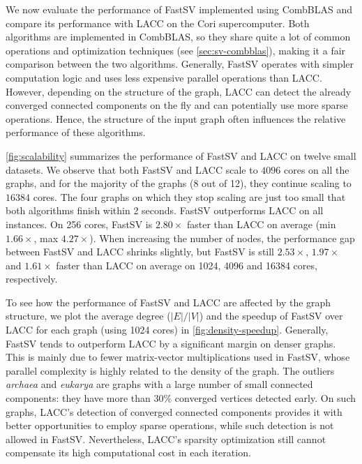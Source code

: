 \documentclass{sokendai_thesis} %
\newcommand{\Name}[0]{FastSV} %
\begin{document}
We now evaluate the performance of \Name{} implemented using CombBLAS and compare its performance with LACC on the Cori supercomputer.
Both algorithms are implemented in CombBLAS, so they share quite a lot of common operations and optimization techniques (see \autoref{sec:sv-combblas}), making it a fair comparison between the two algorithms.
Generally, \Name{} operates with simpler computation logic and uses less expensive parallel operations than LACC.
However, depending on the structure of the graph, LACC can detect the already converged connected components on the fly and can potentially use more sparse operations. 
Hence, the structure of the input graph often influences the relative performance of these algorithms.

\autoref{fig:scalability} summarizes the performance of \Name{} and LACC on twelve small datasets.
We observe that both \Name{} and LACC  scale to $4096$ cores on all the graphs, and for the majority of the graphs (8 out of 12), they continue scaling to $16384$ cores.
The four graphs on which they stop scaling are just too small that both algorithms finish within 2 seconds.
\Name{} outperforms LACC on all instances.
On 256 cores, \Name{} is $2.80\times$ faster than LACC on average (min $1.66\times$, max $4.27\times$).
When increasing the number of nodes, the performance gap between \Name{} and LACC shrinks slightly, but \Name{} is still $2.53\times$, $1.97\times$ and $1.61\times$ faster than LACC on average on 1024, 4096 and 16384 cores, respectively.

To see how the performance of \Name{} and LACC are affected by the graph structure, we plot the average degree ($|E|/|V|$) and the speedup of \Name{} over LACC for each graph (using 1024 cores) in \autoref{fig:density-speedup}.
Generally, \Name{} tends to outperform LACC by a significant margin on denser graphs.
This is mainly due to fewer matrix-vector multiplications used in \Name{}, whose parallel complexity is highly related to the density of the graph.
The outliers \textit{archaea} and \textit{eukarya} are graphs with a large number of small connected components: they have more than $30\%$ converged vertices detected early. 
On such graphs, LACC's detection of converged connected components provides it with better opportunities to employ
sparse operations, while such detection is not allowed in \Name{}.
Nevertheless, LACC's sparsity optimization still cannot compensate its high computational cost in each iteration.
\end{document}
